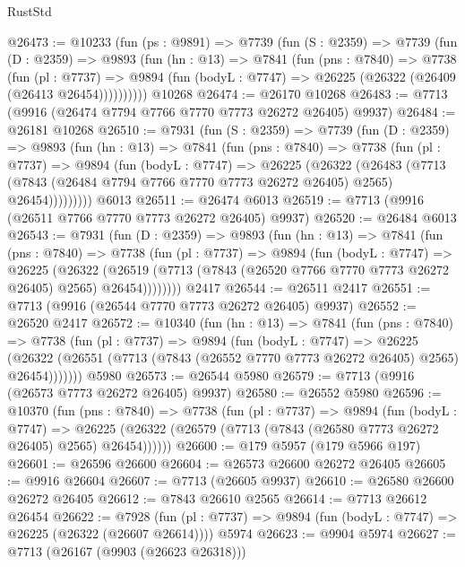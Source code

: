 \begin{lexlean}{RustStd}
\begin{coremodule}
@26473 := @10233
    (fun (ps : @9891) =>
    @7739
      (fun (S : @2359) =>
      @7739
        (fun (D : @2359) =>
        @9893
          (fun (hn : @13) =>
          @7841
            (fun (pns : @7840) =>
            @7738
              (fun (pl : @7737) =>
              @9894 (fun (bodyL : @7747) => @26225 (@26322 (@26409 (@26413 @26454))))))))))
    @10268
@26474 := @26170 @10268
@26483 := @7713 (@9916 (@26474 @7794 @7766 @7770 @7773 @26272 @26405) @9937)
@26484 := @26181 @10268
@26510 := @7931
    (fun (S : @2359) =>
    @7739
      (fun (D : @2359) =>
      @9893
        (fun (hn : @13) =>
        @7841
          (fun (pns : @7840) =>
          @7738
            (fun (pl : @7737) =>
            @9894
              (fun (bodyL : @7747) =>
              @26225
                (@26322
                  (@26483
                    (@7713
                      (@7843 (@26484 @7794 @7766 @7770 @7773 @26272 @26405) @2565)
                      @26454)))))))))
    @6013
@26511 := @26474 @6013
@26519 := @7713 (@9916 (@26511 @7766 @7770 @7773 @26272 @26405) @9937)
@26520 := @26484 @6013
@26543 := @7931
    (fun (D : @2359) =>
    @9893
      (fun (hn : @13) =>
      @7841
        (fun (pns : @7840) =>
        @7738
          (fun (pl : @7737) =>
          @9894
            (fun (bodyL : @7747) =>
            @26225
              (@26322
                (@26519 (@7713 (@7843 (@26520 @7766 @7770 @7773 @26272 @26405) @2565) @26454))))))))
    @2417
@26544 := @26511 @2417
@26551 := @7713 (@9916 (@26544 @7770 @7773 @26272 @26405) @9937)
@26552 := @26520 @2417
@26572 := @10340
    (fun (hn : @13) =>
    @7841
      (fun (pns : @7840) =>
      @7738
        (fun (pl : @7737) =>
        @9894
          (fun (bodyL : @7747) =>
          @26225
            (@26322 (@26551 (@7713 (@7843 (@26552 @7770 @7773 @26272 @26405) @2565) @26454)))))))
    @5980
@26573 := @26544 @5980
@26579 := @7713 (@9916 (@26573 @7773 @26272 @26405) @9937)
@26580 := @26552 @5980
@26596 := @10370
    (fun (pns : @7840) =>
    @7738
      (fun (pl : @7737) =>
      @9894
        (fun (bodyL : @7747) =>
        @26225 (@26322 (@26579 (@7713 (@7843 (@26580 @7773 @26272 @26405) @2565) @26454))))))
@26600 := @179 @5957 (@179 @5966 @197)
@26601 := @26596 @26600
@26604 := @26573 @26600 @26272 @26405
@26605 := @9916 @26604
@26607 := @7713 (@26605 @9937)
@26610 := @26580 @26600 @26272 @26405
@26612 := @7843 @26610 @2565
@26614 := @7713 @26612 @26454
@26622 := @7928
    (fun (pl : @7737) => @9894 (fun (bodyL : @7747) => @26225 (@26322 (@26607 @26614))))
    @5974
@26623 := @9904 @5974
@26627 := @7713 (@26167 (@9903 (@26623 @26318)))

\end{coremodule}
\end{lexlean}
